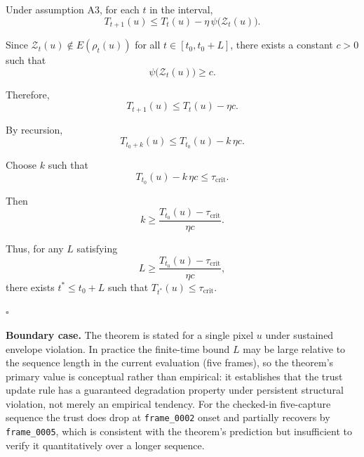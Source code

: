 \documentclass[11pt,letterpaper]{article}
\theoremstyle{gcresult}
\theoremstyle{definition}
\newenvironment{remarkbox}{%
  \begin{tcolorbox}[claimbox]%
}{%
  \end{tcolorbox}%
}
\begin{document}
Under assumption A3, for each $t$ in the interval,
\begin{equation}
T_{t+1}(u)\le T_t(u) - \eta\,\psi\!\bigl(\mathcal{Z}_t(u)\bigr).
\end{equation}

Since $\mathcal{Z}_t(u)\notin E(\rho_t(u))$ for all $t\in[t_0,t_0+L]$, there exists a constant $c>0$ such that
\begin{equation}
\psi\!\bigl(\mathcal{Z}_t(u)\bigr)\ge c.
\end{equation}

Therefore,
\begin{equation}
T_{t+1}(u)\le T_t(u) - \eta c.
\end{equation}

By recursion,
\begin{equation}
T_{t_0+k}(u)\le T_{t_0}(u) - k\,\eta c.
\end{equation}

Choose $k$ such that
\begin{equation}
T_{t_0}(u) - k\,\eta c \le \tau_{\mathrm{crit}}.
\end{equation}

Then
\begin{equation}
k \ge \frac{T_{t_0}(u)-\tau_{\mathrm{crit}}}{\eta c}.
\end{equation}

Thus, for any $L$ satisfying
\begin{equation}
L \ge \frac{T_{t_0}(u)-\tau_{\mathrm{crit}}}{\eta c},
\end{equation}
there exists $t^\ast\le t_0+L$ such that $T_{t^\ast}(u)\le \tau_{\mathrm{crit}}$.

\hfill $\square$

\begin{remarkbox}
\textbf{Boundary case.}
The theorem is stated for a single pixel $u$ under sustained envelope violation. In practice the finite-time bound $L$ may be large relative to the sequence length in the current evaluation (five frames), so the theorem's primary value is conceptual rather than empirical: it establishes that the trust update rule has a guaranteed degradation property under persistent structural violation, not merely an empirical tendency. For the checked-in five-capture sequence the trust does drop at \texttt{frame\_0002} onset and partially recovers by \texttt{frame\_0005}, which is consistent with the theorem's prediction but insufficient to verify it quantitatively over a longer sequence.
\end{remarkbox}
\end{document}
